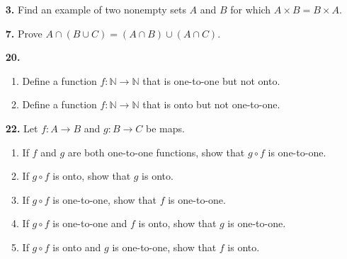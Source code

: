 \documentclass[12pt,reqno]{amsart}
\begin{document}
\begin{enumerate}[{\bf 1.}]
\begin{multicols}{2}
\begin{enumerate}
\end{enumerate}
\end{multicols}

\medskip  

\item[{\bf 3.}]
Find an example of two nonempty sets $A$ and $B$ for which $A \times B = B \times A$.

\medskip

 
\item[{\bf 7.}]
Prove $A \cap (B \cup C) = (A \cap B) \cup (A \cap C)$.

\medskip

\item[{\bf 20.}]
\begin{enumerate}
  
\item
Define a function $f: {\mathbb N} \rightarrow {\mathbb N}$ that is one-to-one but not onto. 
 
\item
Define a function $f: {\mathbb N} \rightarrow {\mathbb N}$ that is onto but not one-to-one. 
 
\end{enumerate}

\medskip
 
\item[{\bf 22.}]
Let $f : A \rightarrow B$ and $g : B \rightarrow C$ be maps.
\begin{enumerate}
 
\item
If $f$ and $g$ are both one-to-one functions, show that $g \circ f$
is one-to-one. 
 
\item
If $g \circ f$ is onto, show that $g$ is onto.
 
\item
If $g \circ f$ is one-to-one, show that $f$ is one-to-one.
 
\item
If $g \circ f$ is one-to-one and $f$ is onto, show that $g$ is
one-to-one.
 
\item
If $g \circ f$ is onto and $g$ is one-to-one, show that $f$ is onto.
 
\end{enumerate}


\end{enumerate}
\end{document}
